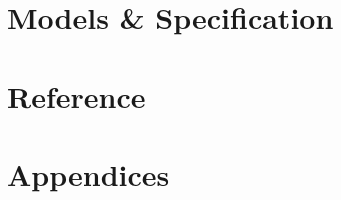 \part{Models \& Specification}\label{part:models}






\part{Reference}\label{part:ref}




\part{Appendices}\label{part:app}
\appendix





\PrintGlossaries





